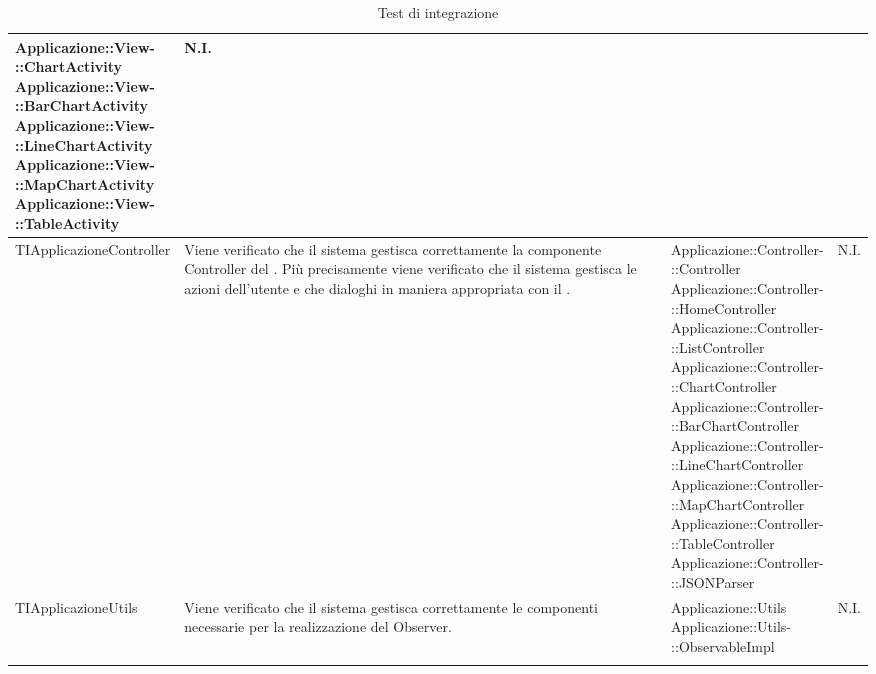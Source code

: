 \begin{longtabu}{| X | X | X[0.9] | X[0.3] |}
{			Applicazione::View-\\::ChartActivity\\
			Applicazione::View-\\::BarChartActivity\\
			Applicazione::View-\\::LineChartActivity\\
			Applicazione::View-\\::MapChartActivity\\
			Applicazione::View-\\::TableActivity}
			& N.I.
\\ \hline
			TIApplicazioneController &
			Viene verificato che il sistema gestisca correttamente la componente Controller del  . Più precisamente viene verificato che il sistema gestisca le azioni dell’utente e che dialoghi in maniera appropriata con il .
			& \parbox[t]{0.6\textwidth}{
			Applicazione::Controller-\\::Controller\\
			Applicazione::Controller-\\::HomeController\\
			Applicazione::Controller-\\::ListController\\
			Applicazione::Controller-\\::ChartController\\
			Applicazione::Controller-\\::BarChartController\\
			Applicazione::Controller-\\::LineChartController\\
			Applicazione::Controller-\\::MapChartController\\
			Applicazione::Controller-\\::TableController\\
			Applicazione::Controller-\\::JSONParser}
			& N.I.
\\ \hline
			TIApplicazioneUtils &
			Viene verificato che il sistema gestisca correttamente le componenti necessarie per la realizzazione del  Observer.
			& \parbox[t]{0.6\textwidth}{
			Applicazione::Utils\\
			Applicazione::Utils-\\::ObservableImpl}
			& N.I. 
\\ \hline

\caption{Test di integrazione}

\end{longtabu}

